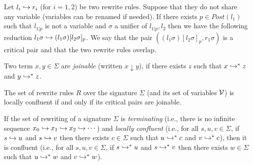 \begin{definition}\label{def:critical-pair}
Let $l_i \re r_i$ (for $i = 1, 2$) be two rewrite rules. Suppose that they do not share any variable (variables can be renamed if needed).
If there exists $p \in Post(l_1)$ such that $l_{1 | p}$ is not a variable and $\sigma$ a unifier of $l_{1 | p}, l_2$ then
we have the following reduction $l_1 \sigma \re (l_1\sigma)[l_2\sigma]_p$. We say that the pair $((l_1\sigma)[l_2\sigma]_p, r_1\sigma)$ is a
critical pair and that the two rewrite rules overlap.
\begin{center}
\end{center}
\end{definition}

\begin{definition}[Joinable]
Two term $x, y \in \Sigma$ are \emph{joinable} (written $x \downarrow y$), if there exists $z$ such that $x \re^* z$ and $y \re^* z$.
\end{definition}

\begin{theorem}\label{thm:cp}
The set of rewrite rules $R$ over the signature $\Sigma$ (and its set of variables $\cal{V}$) is locally confluent if and only if its critical pairs are joinable.
\end{theorem}


\begin{lemma}\label{lem:newman}
If the set of rewriting of a signature $\Sigma$ is \emph{terminating} (i.e., there is no infinite sequence
$x_0 \re x_1 \re x_2 \re \cdots$) and \emph{locally confluent} (i.e., for all $s,u,v \in \Sigma$, if $s \re u$ and $s \re v$ then there exists
$c \in \Sigma$ such that $u \re^{*} c$ and $v \re^{*} c$), then it is confluent (i.e., for all $s,u,v \in \Sigma$, if $s \re^{*} u$ and
$s \re^{*} v$ then there exists $w \in \Sigma$ such that $u \re^{*} w$ and $v \re^{*} w$).
\end{lemma}

